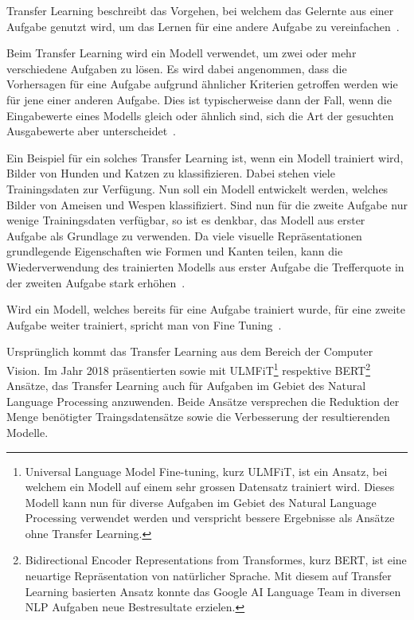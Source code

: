 Transfer Learning beschreibt das Vorgehen, bei welchem das Gelernte aus einer Aufgabe genutzt wird, um das Lernen für eine andere Aufgabe zu vereinfachen~\autocite{Goodfellow2016}.

Beim Transfer Learning wird ein Modell verwendet, um zwei oder mehr verschiedene Aufgaben zu lösen. Es wird dabei angenommen, dass die Vorhersagen für eine Aufgabe aufgrund ähnlicher Kriterien getroffen werden wie für jene einer anderen Aufgabe. Dies ist typischerweise dann der Fall, wenn die Eingabewerte eines Modells gleich oder ähnlich sind, sich die Art der gesuchten Ausgabewerte aber unterscheidet~\autocite{Goodfellow2016}.

Ein Beispiel für ein solches Transfer Learning ist, wenn ein Modell trainiert wird, Bilder von Hunden und Katzen zu klassifizieren. Dabei stehen viele Trainingsdaten zur Verfügung. Nun soll ein Modell entwickelt werden, welches Bilder von Ameisen und Wespen klassifiziert. Sind nun für die zweite Aufgabe nur wenige Trainingsdaten verfügbar, so ist es denkbar, das Modell aus erster Aufgabe als Grundlage zu verwenden. Da viele visuelle Repräsentationen grundlegende Eigenschaften wie Formen und Kanten teilen, kann die Wiederverwendung des trainierten Modells aus erster Aufgabe die Trefferquote in der zweiten Aufgabe stark erhöhen~\autocite{Goodfellow2016}.

Wird ein Modell, welches bereits für eine Aufgabe trainiert wurde, für eine zweite Aufgabe weiter trainiert, spricht man von Fine Tuning~\autocite{Goodfellow2016}.

Ursprünglich kommt das Transfer Learning aus dem Bereich der Computer Vision. Im Jahr 2018 präsentierten \textcite{Howard2018} sowie \textcite{Devlin2018} mit ULMFiT\footnote{Universal Language Model Fine-tuning, kurz ULMFiT, ist ein Ansatz, bei welchem ein Modell auf einem sehr grossen Datensatz trainiert wird. Dieses Modell kann nun für diverse Aufgaben im Gebiet des Natural Language Processing verwendet werden und verspricht bessere Ergebnisse als Ansätze ohne Transfer Learning\autocite{Howard2018}.} respektive BERT\footnote{Bidirectional Encoder Representations from Transformes, kurz BERT, ist eine neuartige Repräsentation von natürlicher Sprache. Mit diesem auf Transfer Learning basierten Ansatz konnte das Google AI Language Team in diversen NLP Aufgaben neue Bestresultate erzielen\autocite{Devlin2018}.} Ansätze, das Transfer Learning auch für Aufgaben im Gebiet des Natural Language Processing anzuwenden. Beide Ansätze versprechen die Reduktion der Menge benötigter Traingsdatensätze sowie die Verbesserung der resultierenden Modelle.

